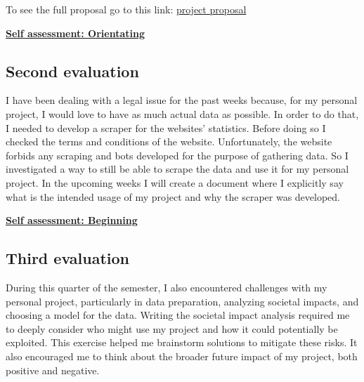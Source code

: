 \documentclass{article}
\begin{document}
	To see the full proposal go to this link: \href{https://github.com/BurovDanil/MinorAI/blob/main/Documents/Project%20Proposal/Proposal.md}{project proposal}
	
	\underline{\textbf{Self assessment: Orientating}}
	
	\subsection{Second evaluation}
	I have been dealing with a legal issue for the past weeks because, for my personal project, I would love to have as much actual data as possible. 
	In order to do that, I needed to develop a scraper for the websites' statistics. Before doing so I checked the terms and conditions of the website. 
	Unfortunately, the website forbids any scraping and bots developed for the purpose of gathering data. So I investigated a way to still be able 
	to scrape the data and use it for my personal project. In the upcoming weeks I will create a document where I explicitly say what is the intended usage of 
	my project and why the scraper was developed.
	
	\underline{\textbf{Self assessment: Beginning}}
	
	\subsection{Third evaluation}
	During this quarter of the semester, I also encountered challenges with my personal project, particularly in data preparation, analyzing societal impacts, and choosing a model for the data. Writing the societal impact analysis required me to deeply consider who might use my project and how it could potentially be exploited. This exercise helped me brainstorm solutions to mitigate these risks. It also encouraged me to think about the broader future impact of my project, both positive and negative.\\
	
\end{document}
